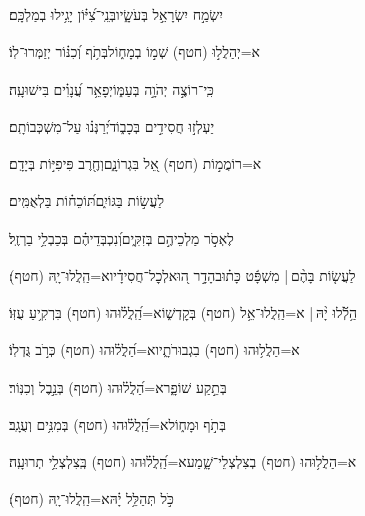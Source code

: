 \documentclass[12pt]{article}
\newcommand{\loc}[1]{\textsuperscript{\locf{#1}}}
\begin{document}
{\loc{ ב}~}‏יִשְׂמַ֣ח יִשְׂרָאֵ֣ל בְּעֹשָׂ֑יו{\hfill}בְּנֵֽי־צִ֝יּ֗וֹן יָגִ֥ילוּ בְמַלְכָּֽם׃\par

{\loc{ ג}~}‏א=יְהַלֲל֣וּ (חטף) שְׁמ֣וֹ בְמָח֑וֹל{\hfill}בְּתֹ֥ף וְ֝כִנּ֗וֹר יְזַמְּרוּ־לֽוֹ׃\par

{\loc{ ד}~}‏כִּֽי־רוֹצֶ֣ה יְהֹוָ֣ה בְּעַמּ֑וֹ{\hfill}יְפָאֵ֥ר עֲ֝נָוִ֗ים בִּישׁוּעָֽה׃\par

{\loc{ ה}~}‏יַעְלְז֣וּ חֲסִידִ֣ים בְּכָב֑וֹד{\hfill}יְ֝רַנְּנ֗וּ עַל־מִשְׁכְּבוֹתָֽם׃\par

{\loc{ ו}~}‏א=רוֹמֲמ֣וֹת (חטף) אֵ֭ל בִּגְרוֹנָ֑ם{\hfill}וְחֶ֖רֶב פִּיפִיּ֣וֹת בְּיָדָֽם׃\par

{\loc{ ז}~}‏לַעֲשׂ֣וֹת  בַּגּוֹיִ֑ם{\hfill}תּ֝וֹכֵח֗וֹת בַּלְאֻמִּֽים׃\par

{\loc{ ח}~}‏לֶאְסֹ֣ר מַלְכֵיהֶ֣ם בְּזִקִּ֑ים{\hfill}וְ֝נִכְבְּדֵיהֶ֗ם בְּכַבְלֵ֥י בַרְזֶֽל׃\par

{\loc{ ט}~}‏לַעֲשׂ֤וֹת בָּהֶ֨ם |  מִשְׁפָּ֬ט כָּת֗וּב{\hfill}הָדָ֣ר ה֭וּא\newline\hspace*{.5em}לְכׇל־חֲסִידָ֗יו{\hfill}א=הַֽלֲלוּ־יָֽהּ (חטף)׃\par\pend

\pstart[\subsection*{\textcolor{red}{פרק קנ}}]\label{פרק קנ}
{\loc{ א}~}‏הַ֥לְﬞלוּ יָ֨הּ | \newline\hspace*{.5em}א=הַֽלֲלוּ־אֵ֥ל (חטף) בְּקׇדְשׁ֑וֹ{\hfill}א=הַֽ֝לֲל֗וּהוּ (חטף) בִּרְקִ֥יעַ עֻזּֽוֹ׃\par

{\loc{ ב}~}‏א=הַלֲל֥וּהוּ (חטף) בִגְבוּרֹתָ֑יו{\hfill}א=הַ֝לֲל֗וּהוּ (חטף) כְּרֹ֣ב גֻּדְלֽוֹ׃\par

{\loc{ ג}~}‏ בְּתֵ֣קַע שׁוֹפָ֑ר{\hfill}א=הַ֝לֲל֗וּהוּ (חטף) בְּנֵ֣בֶל וְכִנּֽוֹר׃\par

{\loc{ ד}~}‏ בְּתֹ֣ף וּמָח֑וֹל{\hfill}א=הַֽ֝לֲל֗וּהוּ (חטף) בְּמִנִּ֥ים וְעֻגָֽב׃\par

{\loc{ ה}~}‏א=הַלֲל֥וּהוּ (חטף) בְצִלְצְלֵי־שָׁ֑מַע{\hfill}א=הַֽ֝לֲל֗וּהוּ (חטף) בְּֽצִלְצְלֵ֥י תְרוּעָֽה׃\par

{\loc{ ו}~}‏כֹּ֣ל  תְּהַלֵּ֥ל יָ֗הּ{\hfill}א=הַֽלֲלוּ־יָֽהּ (חטף)׃\par\pend
\ledpb
    \endnumbering
    
\end{document}
